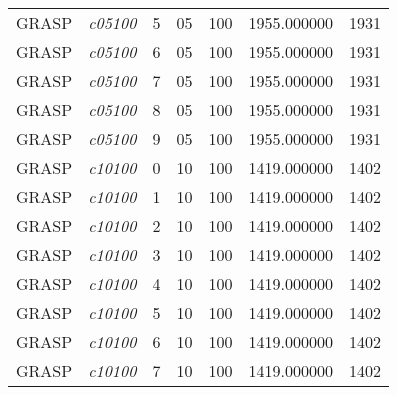 {\begin{longtable}{cc|c|cc|cc}
			GRASP              & \textit{c05100}    & 5                               & 05               & 100              & 1955.000000                          & 1931 \\ 
			GRASP              & \textit{c05100}    & 6                               & 05               & 100              & 1955.000000                          & 1931 \\ 
			GRASP              & \textit{c05100}    & 7                               & 05               & 100              & 1955.000000                          & 1931 \\ 
			GRASP              & \textit{c05100}    & 8                               & 05               & 100              & 1955.000000                          & 1931 \\ 
			GRASP              & \textit{c05100}    & 9                               & 05               & 100              & 1955.000000                          & 1931 \\ \hline
			GRASP              & \textit{c10100}    & 0                               & 10               & 100              & 1419.000000                          & 1402 \\ 
			GRASP              & \textit{c10100}    & 1                               & 10               & 100              & 1419.000000                          & 1402 \\ 
			GRASP              & \textit{c10100}    & 2                               & 10               & 100              & 1419.000000                          & 1402 \\ 
			GRASP              & \textit{c10100}    & 3                               & 10               & 100              & 1419.000000                          & 1402 \\ 
			GRASP              & \textit{c10100}    & 4                               & 10               & 100              & 1419.000000                          & 1402 \\ 
			GRASP              & \textit{c10100}    & 5                               & 10               & 100              & 1419.000000                          & 1402 \\ 
			GRASP              & \textit{c10100}    & 6                               & 10               & 100              & 1419.000000                          & 1402 \\ 
			GRASP              & \textit{c10100}    & 7                               & 10               & 100              & 1419.000000                          & 1402 \\ 

\end{longtable}}
